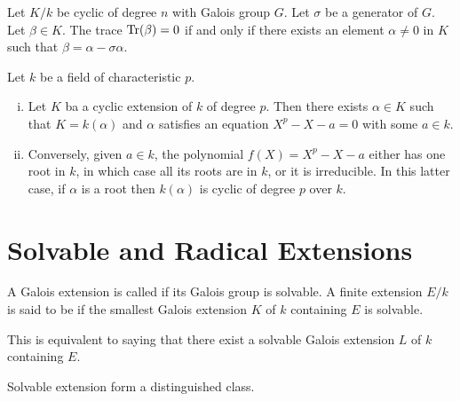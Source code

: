   \begin{thm}
    Let $K/k$ be cyclic of degree $n$ with Galois group $G$. Let $\sigma$ be a generator of $G$. Let $\beta\in K$. The trace $\operatorname{Tr}(\beta)=0$ if and only if there exists an element $\alpha\neq0$ in $K$ such that $\beta=\alpha-\sigma\alpha$.
  \end{thm}

  \begin{thm}
    Let $k$ be a field of characteristic $p$.
    \begin{enumerate}[(i)]
      \item Let $K$ ba a cyclic extension of $k$ of degree $p$. Then there exists $\alpha\in K$ such that $K=k(\alpha)$ and $\alpha$ satisfies an equation $X^p-X-a=0$ with some $a\in k$.
      \item Conversely, given $a\in k$, the polynomial $f(X)=X^p-X-a$ either has one root in $k$, in which case all its roots are in $k$, or it is irreducible. In this latter case, if $\alpha$ is a root then $k(\alpha)$ is cyclic of degree $p$ over $k$.
    \end{enumerate}
  \end{thm}

\newpage\section{Solvable and Radical Extensions}

  \begin{defn}
    A Galois extension is called  if its Galois group is solvable. A finite extension $E/k$ is said to be  if the smallest Galois extension $K$ of $k$ containing $E$ is solvable.
  \end{defn}
  \begin{rem}
     This is equivalent to saying that there exist a solvable Galois extension $L$ of $k$ containing $E$.
  \end{rem}

  \begin{prop}
    Solvable extension form a distinguished class.
  \end{prop}

